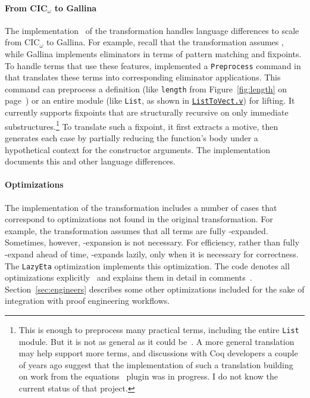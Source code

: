 \paragraph{From CIC$_{\omega}$ to Gallina}
The implementation~\href{https://github.com/uwplse/pumpkin-pi/blob/v2.0.0/plugin/src/automation/lift/lift.ml}{} %
of the transformation handles language differences to scale from CIC$_{\omega}$ to Gallina.
For example, recall that the transformation assumes , while Gallina implements eliminators in terms of pattern matching and fixpoints. 
To handle terms that use these features,  implemented a \lstinline{Preprocess} command in \toolnamec that 
translates these terms into corresponding eliminator applications.
This command can preprocess a definition (like \lstinline{length} from Figure~\ref{fig:length} on page~\pageref{fig:length}) or an entire module
(like \lstinline{List}, as shown in \href{http://github.com/uwplse/ornamental-search/blob/itp+equiv/plugin/coq/examples/ListToVect.v}{\lstinline{ListToVect.v}}) for lifting. %
It currently supports fixpoints that are structurally recursive on only 
immediate substructures.\footnote{This is enough to preprocess many practical terms, including the entire \lstinline{List} module.
But it is not as general as it could be~\cite{recursion-elimination, jesper}.
A more general translation may help \toolnamec support more terms, and discussions
with Coq developers a couple of years ago suggest that the implementation of such a translation
building on work from the equations~\cite{sozeau:equations} plugin was in progress.
I do not know the current status of that project.}
To translate such a fixpoint, it first extracts a motive, then generates each case
by partially reducing the function's body under a hypothetical context for the constructor arguments.
The implementation documents this and other language differences.

\paragraph{Optimizations}
The implementation of the transformation includes a number of cases that correspond to optimizations
not found in the original transformation.
For example, the transformation assumes that all terms are fully \smallmath{$\eta$}-expanded. Sometimes,
however, \smallmath{$\eta$}-expansion is not necessary.
For efficiency, rather than fully \smallmath{$\eta$}-expand ahead of time, \toolnamec \smallmath{$\eta$}-expands lazily, 
only when it is necessary for correctness.
The \lstinline{LazyEta} optimization implements this optimization.
The code denotes all optimizations explicitly~\href{https://github.com/uwplse/pumpkin-pi/blob/v2.0.0/plugin/src/automation/lift/lift.ml}{}
and explains them in detail in comments~\href{https://github.com/uwplse/pumpkin-pi/blob/v2.0.0/plugin/src/automation/lift/liftrules.ml}{}.
Section~\ref{sec:engineers} describes some other optimizations included for the sake of integration with proof engineering workflows.

